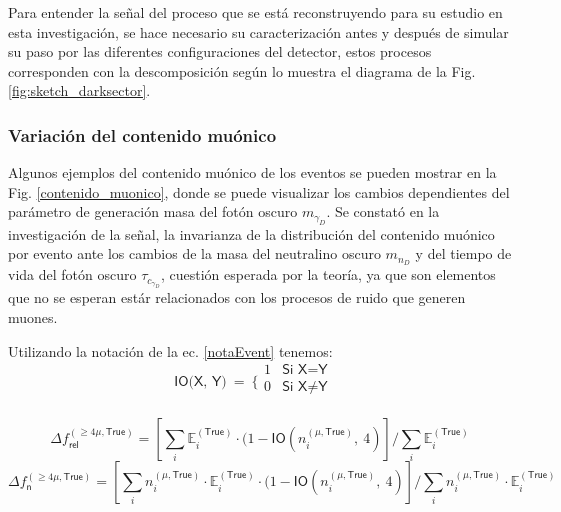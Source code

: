 Para entender la señal del proceso que se está reconstruyendo para su estudio en esta investigación, se hace necesario su caracterización antes y después de simular su paso por las diferentes configuraciones del detector, estos procesos corresponden con la descomposición según lo muestra el diagrama de la Fig. \ref{fig:sketch_darksector}.

\subsubsection{Variación del contenido muónico}

Algunos ejemplos del contenido muónico de los eventos se pueden mostrar en la Fig. \ref{contenido_muonico}, donde se puede visualizar los cambios dependientes del parámetro de generación masa del fotón oscuro $m_{\gamma_D}$. Se constató en la investigación de la señal, la invarianza de la distribución del contenido muónico por evento ante los cambios de la masa del neutralino oscuro $m_{n_D}$ y del tiempo de vida del fotón oscuro $\tau_{c_{\gamma_D}}$, cuestión esperada por la teoría, ya que son elementos que no se esperan estár relacionados con los procesos de ruido que generen muones.

Utilizando la notación de la ec. \ref{notaEvent} tenemos:
\begin{equation}
\textsf{IO(X,~Y)} ~ = ~ \Bigg\{\begin{matrix}
1 & \textsf{Si X=Y}~~~~\\ 
0 & \textsf{Si X}\not= \textsf{Y}\\ 
\end{matrix} 
\end{equation}

\begin{equation}
\Delta f^{(\geqslant 4\mu, \textsf{True})}_\textsf{rel} = \left[ \sum_{i} \mathbb{E}_i^{(\textsf{True})} \cdot (1- \textsf{IO}(n^{(\mu,\textsf{True})}_i,~ 4) \right]/\sum_{i} \mathbb{E}_i^{(\textsf{True})}
\end{equation}
\begin{equation}
\Delta f^{(\geqslant 4\mu, \textsf{True})}_\textsf{n} = \left[ \sum_{i} n^{(\mu,\textsf{True})}_i \cdot \mathbb{E}_i^{(\textsf{True})} \cdot (1- \textsf{IO}(n^{(\mu,\textsf{True})}_i,~ 4) \right]/\sum_{i} n^{(\mu,\textsf{True})}_i \cdot \mathbb{E}_i^{(\textsf{True})} 
\end{equation}

